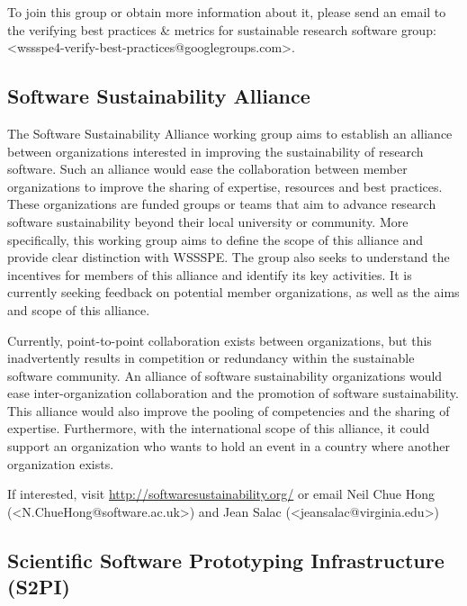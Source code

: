 \documentclass[11pt, oneside]{amsart}
\newcommand{\note}[1]{ {\textcolor{blueish}    { ***Note:      #1 }}}
\begin{document}
To join this group or obtain more information about it, please send an email to the verifying best practices \& metrics for sustainable research software group: <wssspe4-verify-best-practices@googlegroups.com>.


\subsection{Software Sustainability Alliance}
\label{sec:alliance}


The Software Sustainability Alliance working group aims to establish an alliance between organizations interested in improving the sustainability of research software. Such an alliance would ease the collaboration between member organizations to improve the sharing of expertise, resources and best practices.
These organizations are funded groups or teams that aim to advance research software sustainability beyond their local university or community. More specifically, this working group aims to define the scope of this alliance and provide clear distinction with WSSSPE. The group also seeks to understand the incentives for members of this alliance and identify its key activities.
It is currently seeking feedback on potential member organizations, as well as the aims and scope of this alliance.

Currently, point-to-point collaboration exists between organizations, but this inadvertently results in competition or redundancy within the sustainable software community. An alliance of software sustainability organizations would ease inter-organization collaboration and the promotion of software sustainability. This alliance would also improve the pooling of competencies and the sharing of expertise. Furthermore, with the international scope of this alliance, it could support an organization who wants to hold an event in a country where another organization exists.

If interested, visit \url{http://softwaresustainability.org/} or email Neil Chue Hong (<N.ChueHong@software.ac.uk>) and Jean Salac (<jeansalac@virginia.edu>)

\subsection{Scientific Software Prototyping Infrastructure (S2PI)}
\label{sec:prototyping}
\end{document}
